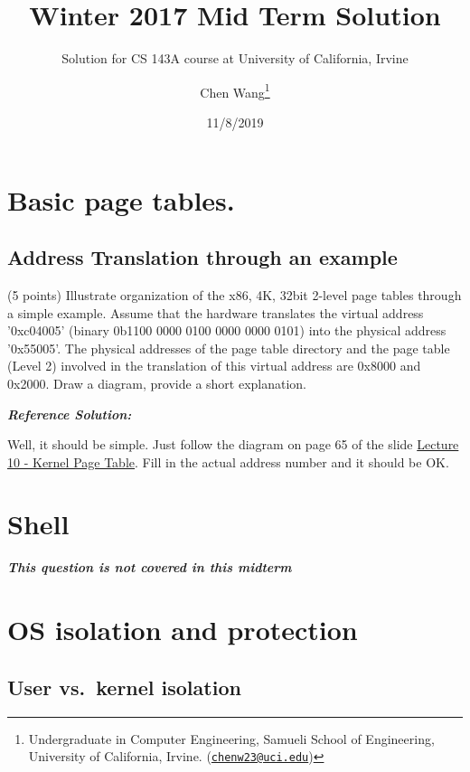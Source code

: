 \documentclass[]{article}
\title{Winter 2017 Mid Term Solution}
\subtitle{Solution for CS 143A course at University of California, Irvine}
\author{Chen Wang\footnote{Undergraduate in Computer Engineering, Samueli School
  of Engineering, University of California, Irvine.
  (\href{mailto:chenw23@uci.edu}{\nolinkurl{chenw23@uci.edu}})}}
\date{11/8/2019}
\begin{document}
\maketitle

{
\setcounter{tocdepth}{3}
\tableofcontents
}
\hypertarget{basic-page-tables.}{%
\section{Basic page tables.}\label{basic-page-tables.}}

\hypertarget{address-translation-through-an-example}{%
\subsection{Address Translation through an
example}\label{address-translation-through-an-example}}

(5 points) Illustrate organization of the x86, 4K, 32bit 2-level page
tables through a simple example. Assume that the hardware translates the
virtual address '0xc04005' (binary 0b1100 0000 0100 0000 0000 0101) into
the physical address '0x55005'. The physical addresses of the page table
directory and the page table (Level 2) involved in the translation of
this virtual address are 0x8000 and 0x2000. Draw a diagram, provide a
short explanation.

\textbf{\emph{Reference Solution:}}

Well, it should be simple. Just follow the diagram on page 65 of the
slide
\href{https://www.ics.uci.edu/~aburtsev/143A/lectures/lecture10-kernel-page-table/lecture10-kernel-page-table.pdf}{Lecture
10 - Kernel Page Table}. Fill in the actual address number and it should
be OK.

\hypertarget{shell}{%
\section{Shell}\label{shell}}

\textbf{\emph{This question is not covered in this midterm}}

\hypertarget{os-isolation-and-protection}{%
\section{OS isolation and
protection}\label{os-isolation-and-protection}}

\hypertarget{user-vs.kernel-isolation}{%
\subsection{User vs.~kernel isolation}\label{user-vs.kernel-isolation}}
\end{document}

